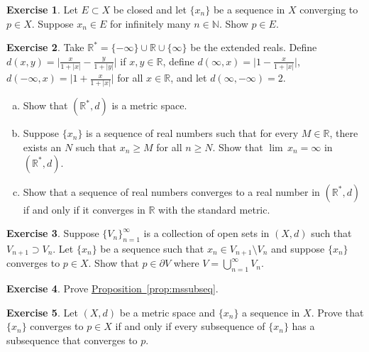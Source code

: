\documentclass[12pt,openany]{book}
\newcommand{\abs}[1]{\left\lvert {#1} \right\rvert}
\newcommand{\R}{{\mathbb{R}}}
\newcommand{\N}{{\mathbb{N}}}
\theoremstyle{plain}
\theoremstyle{remark}
\theoremstyle{definition}
\newenvironment{exbox}{%
    \def\FrameCommand{\vrule width 1pt \relax\hspace {10pt}}%
    \MakeFramed {\advance \hsize -\width \FrameRestore }%
}{%
    \endMakeFramed
}
\newenvironment{exparts}{%
    \leavevmode\begin{enumerate}[a),noitemsep,topsep=0pt,parsep=0pt,partopsep=0pt]
}{%
    \end{enumerate}
}
\theoremstyle{exercise}
\newtheorem{exercise}{Exercise}[section]
\theoremstyle{example}
\newcommand{\propref}[1]{\hyperref[#1]{Proposition~\ref*{#1}}}
\begin{document}
\begin{exbox}
\begin{exercise}
Let $E \subset X$ be closed and
let $\{ x_n \}$ be a sequence in $X$ converging to $p \in X$.  Suppose
$x_n \in E$ for infinitely many $n \in \N$.  Show $p \in E$.
\end{exercise}

\begin{exercise} \label{exercise:extendedrealsmetric}
Take $\R^* = \{ -\infty \} \cup \R \cup \{ \infty \}$ be the extended reals.
Define $d(x,y) = \bigl\lvert \frac{x}{1+\abs{x}} - \frac{y}{1+\abs{y}}
\bigr\rvert$
if $x, y \in \R$,
define $d(\infty,x) = \bigl\lvert 1 - \frac{x}{1+\abs{x}} \bigr\rvert$,
$d(-\infty,x) = \bigl\lvert 1 + \frac{x}{1+\abs{x}} \bigr\rvert$
for all $x \in \R$, and
let $d(\infty,-\infty) = 2$.
\begin{exparts}
\item
Show that $(\R^*,d)$ is a metric space.
\item
Suppose $\{ x_n \}$ is a sequence of real numbers such that
for every $M \in \R$, there exists an $N$ such that
$x_n \geq M$ for all $n \geq N$.  Show that $\lim\, x_n = \infty$ in
$(\R^*,d)$.
\item
Show that a sequence of real numbers converges to a real number
in $(\R^*,d)$ if and
only if it converges in $\R$ with the standard metric.
\end{exparts}
\end{exercise}

\begin{exercise}
Suppose $\{ V_n \}_{n=1}^\infty$ is a collection of open sets
in $(X,d)$
such that $V_{n+1} \supset V_n$.  Let $\{ x_n \}$ be a sequence
such that $x_n \in V_{n+1} \setminus V_n$ and suppose 
$\{ x_n \}$ converges to $p \in X$.  Show that $p \in \partial V$
where $V = \bigcup_{n=1}^\infty V_n$.
\end{exercise}

\begin{exercise}
Prove \propref{prop:mssubseq}.
\end{exercise}

\begin{exercise}
Let $(X,d)$ be a metric space and $\{ x_n \}$ a sequence in $X$.
Prove that $\{ x_n \}$ converges to $p \in X$
if and only if
every subsequence of $\{ x_n \}$ has a subsequence that
converges to $p$.
\end{exercise}


\end{exbox}
\end{document}
